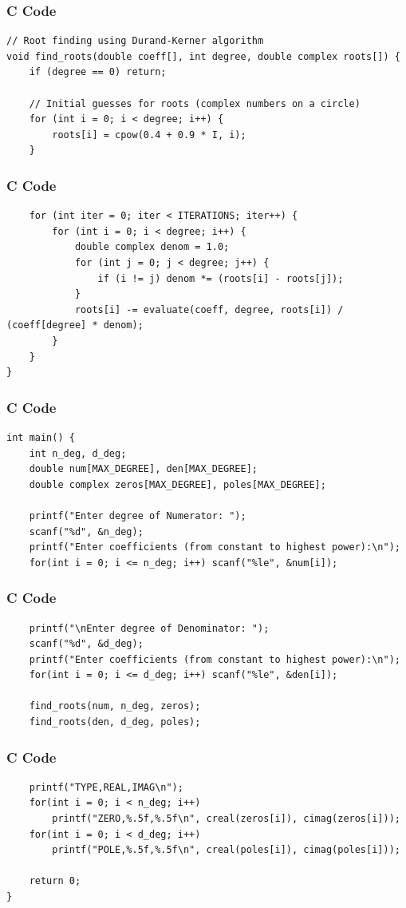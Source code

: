 \documentclass{beamer}
\begin{document}
\begin{frame}[fragile]
\frametitle{C Code}
\begin{lstlisting}
// Root finding using Durand-Kerner algorithm
void find_roots(double coeff[], int degree, double complex roots[]) {
    if (degree == 0) return;
    
    // Initial guesses for roots (complex numbers on a circle)
    for (int i = 0; i < degree; i++) {
        roots[i] = cpow(0.4 + 0.9 * I, i);
    }
\end{lstlisting}
\end{frame}

\begin{frame}[fragile]
\frametitle{C Code}
\begin{lstlisting}
    for (int iter = 0; iter < ITERATIONS; iter++) {
        for (int i = 0; i < degree; i++) {
            double complex denom = 1.0;
            for (int j = 0; j < degree; j++) {
                if (i != j) denom *= (roots[i] - roots[j]);
            }
            roots[i] -= evaluate(coeff, degree, roots[i]) / (coeff[degree] * denom);
        }
    }
}
\end{lstlisting}
\end{frame}

\begin{frame}[fragile]
\frametitle{C Code}
\begin{lstlisting}
int main() {
    int n_deg, d_deg;
    double num[MAX_DEGREE], den[MAX_DEGREE];
    double complex zeros[MAX_DEGREE], poles[MAX_DEGREE];

    printf("Enter degree of Numerator: ");
    scanf("%d", &n_deg);
    printf("Enter coefficients (from constant to highest power):\n");
    for(int i = 0; i <= n_deg; i++) scanf("%le", &num[i]);
\end{lstlisting}
\end{frame}

\begin{frame}[fragile]
\frametitle{C Code}
\begin{lstlisting}
    printf("\nEnter degree of Denominator: ");
    scanf("%d", &d_deg);
    printf("Enter coefficients (from constant to highest power):\n");
    for(int i = 0; i <= d_deg; i++) scanf("%le", &den[i]);

    find_roots(num, n_deg, zeros);
    find_roots(den, d_deg, poles);
\end{lstlisting}
\end{frame}

\begin{frame}[fragile]
\frametitle{C Code}
\begin{lstlisting}
    printf("TYPE,REAL,IMAG\n");
    for(int i = 0; i < n_deg; i++) 
        printf("ZERO,%.5f,%.5f\n", creal(zeros[i]), cimag(zeros[i]));
    for(int i = 0; i < d_deg; i++) 
        printf("POLE,%.5f,%.5f\n", creal(poles[i]), cimag(poles[i]));

    return 0;
}
\end{lstlisting}
\end{frame}
\end{document}
